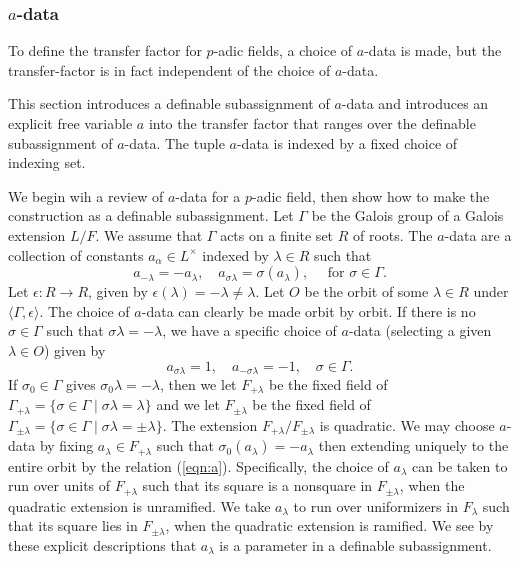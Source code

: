 \subsubsection{$a$-data}

To define the transfer factor for $p$-adic  fields, a choice of $a$-data is made, but the transfer-factor is in fact independent of the choice of $a$-data.

This section introduces a definable subassignment of $a$-data and introduces an explicit free variable $a$ into the transfer factor that ranges over
the definable subassignment of $a$-data.  The tuple $a$-data is indexed by a fixed choice of indexing set.  

We begin wih a review of $a$-data for a $p$-adic field, then show how to make the construction as a definable subassignment.
Let $\Gamma$ be the Galois group of a Galois extension $L/F$.  We assume that $\Gamma$ acts on a finite set $R$ of roots.
The $a$-data are a collection of constants $a_\alpha\in L^\times$ indexed by $\lambda\in R$ such that
\begin{equation}\label{eqn:a}
a_{-\lambda} = -a_\lambda,\quad a_{\sigma\lambda} = \sigma(a_\lambda),\quad \text{ for } \sigma\in \Gamma.
\end{equation}
Let $\epsilon:R\to R$, given by $\epsilon(\lambda)=-\lambda\ne\lambda$.  Let $O$ be the orbit of some $\lambda\in R$ under $\langle\Gamma,\epsilon\rangle$.
The choice of $a$-data can clearly be made orbit by orbit.
If there is no $\sigma\in \Gamma$ such that $\sigma\lambda=-\lambda$, we have a specific choice of $a$-data (selecting a given $\lambda\in O$) given by
\[
a_{\sigma\lambda}=1,\quad a_{-\sigma\lambda}=-1,\quad \sigma\in\Gamma.
\]
If $\sigma_0\in\Gamma$ gives $\sigma_0\lambda=-\lambda$,  then we let $F_{+\lambda}$ be the fixed field of $\Gamma_{+\lambda} = \{\sigma\in\Gamma\mid \sigma\lambda=\lambda\}$
and we let
$F_{\pm\lambda}$ be the fixed field of $\Gamma_{\pm\lambda} = \{\sigma\in\Gamma\mid \sigma\lambda=\pm\lambda\}$.
The extension $F_{+\lambda}/F_{\pm\lambda}$ is quadratic.
We may choose $a$-data by fixing $a_\lambda\in F_{+\lambda}$ such that $\sigma_0(a_\lambda) = -a_\lambda$ then extending uniquely to the entire orbit  by the relation (\ref{eqn:a}).
Specifically, the choice of $a_\lambda$ can be taken to run over units of $F_{+\lambda}$ such that its square is a nonsquare in $F_{\pm\lambda}$, when the quadratic extension is unramified.
We take $a_\lambda$ to run over uniformizers in $F_{\lambda}$ such that its square lies in $F_{\pm\lambda}$, when the quadratic extension is ramified.
We see by these explicit descriptions that $a_\lambda$ is a parameter in a definable subassignment.



